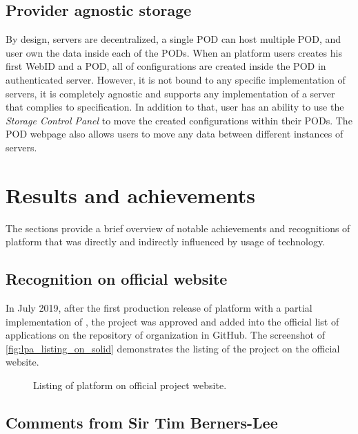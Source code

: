 \subsection{Provider agnostic storage}

By design, \solid{} servers are decentralized, a single \solid{} POD can host multiple \solid{} POD, and user own the data inside each of the PODs. When an \lpa{} platform users creates his first WebID and a \solid{} POD, all of \lpa{} configurations are created inside the \solid{} POD in authenticated \solid{} server. However, it is not bound to any specific implementation of \solid{} servers, it is completely agnostic and supports any implementation of a server that complies to \solid{} specification. In addition to that, user has an ability to use the \textit{Storage Control Panel} to move the created configurations within their PODs. The \solid{} POD webpage also allows users to move any data between different instances of \solid{} servers.

\section{Results and achievements}

The sections provide a brief overview of notable achievements and recognitions of \lpa{} platform that was directly and indirectly influenced by usage of \solid{} technology. 

\subsection{Recognition on official \solid{} website}

In July 2019, after the first production release of \lpa{} platform with a partial implementation of \lpas{}, the project was approved and added into the official list of \solid{} applications on the repository of \solid{} organization in GitHub. The screenshot of \autoref{fig:lpa_listing_on_solid} demonstrates the listing of the project on the official website.

\begin{figure}[h]
\centering
{}
\caption{Listing of \lpa{} platform on official \solid{} project website.}
\label{fig:lpa_listing_on_solid}
\end{figure}

\subsection{Comments from Sir Tim Berners-Lee}


